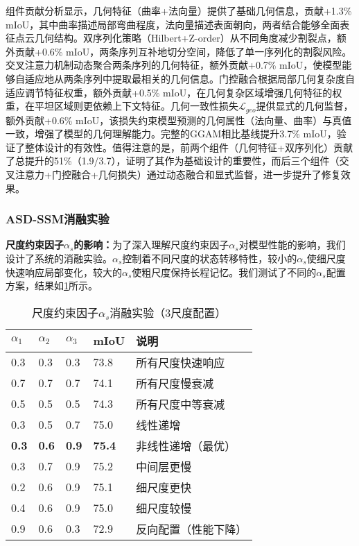 \documentclass[preprint,12pt]{elsarticle}
\begin{document}
组件贡献分析显示，几何特征（曲率+法向量）提供了基础几何信息，贡献+1.3\% mIoU，其中曲率描述局部弯曲程度，法向量描述表面朝向，两者结合能够全面表征点云几何结构。双序列化策略（Hilbert+Z-order）从不同角度减少割裂点，额外贡献+0.6\% mIoU，两条序列互补地切分空间，降低了单一序列化的割裂风险。交叉注意力机制动态聚合两条序列的几何特征，额外贡献+0.7\% mIoU，使模型能够自适应地从两条序列中提取最相关的几何信息。门控融合根据局部几何复杂度自适应调节特征权重，额外贡献+0.5\% mIoU，在几何复杂区域增强几何特征的权重，在平坦区域则更依赖上下文特征。几何一致性损失$\mathcal{L}_{geo}$提供显式的几何监督，额外贡献+0.6\% mIoU，该损失约束模型预测的几何属性（法向量、曲率）与真值一致，增强了模型的几何理解能力。完整的GGAM相比基线提升3.7\% mIoU，验证了整体设计的有效性。值得注意的是，前两个组件（几何特征+双序列化）贡献了总提升的51\%（1.9/3.7），证明了其作为基础设计的重要性，而后三个组件（交叉注意力+门控融合+几何损失）通过动态融合和显式监督，进一步提升了修复效果。

\subsubsection{ASD-SSM消融实验}

\textbf{尺度约束因子$\alpha_s$的影响：}为了深入理解尺度约束因子$\alpha_s$对模型性能的影响，我们设计了系统的消融实验。$\alpha_s$控制着不同尺度的状态转移特性，较小的$\alpha_s$使细尺度快速响应局部变化，较大的$\alpha_s$使粗尺度保持长程记忆。我们测试了不同的$\alpha_s$配置方案，结果如\cref{tab:alpha_ablation}所示。

\begin{table}[htbp!]
	\centering
	\caption{尺度约束因子$\alpha_s$消融实验（3尺度配置）}
	\label{tab:alpha_ablation}
	\begin{tabular}{@{}lllll@{}}
		\toprule
		$\alpha_1$ & $\alpha_2$ & $\alpha_3$ & mIoU & 说明 \\ 
		\midrule
		0.3 & 0.3 & 0.3 & 73.8 & 所有尺度快速响应 \\
		0.7 & 0.7 & 0.7 & 74.1 & 所有尺度慢衰减 \\
		0.5 & 0.5 & 0.5 & 74.3 & 所有尺度中等衰减 \\
		\midrule
		0.3 & 0.5 & 0.7 & 75.0 & 线性递增 \\
		\textbf{0.3} & \textbf{0.6} & \textbf{0.9} & \textbf{75.4} & 非线性递增（最优） \\
		0.3 & 0.7 & 0.9 & 75.2 & 中间层更慢 \\
		0.2 & 0.6 & 0.9 & 75.1 & 细尺度更快 \\
		0.4 & 0.6 & 0.9 & 75.0 & 细尺度较慢 \\
		\midrule
		0.9 & 0.6 & 0.3 & 72.9 & 反向配置（性能下降） \\
		\bottomrule
	\end{tabular}
\end{table}
\end{document}
